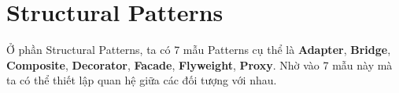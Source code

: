 \section{Structural Patterns}
Ở phần Structural Patterns, ta có 7 mẫu Patterns cụ thể là \textbf{Adapter}, \textbf{Bridge}, \textbf{Composite}, \textbf{Decorator}, \textbf{Facade}, \textbf{Flyweight}, \textbf{Proxy}. Nhờ vào 7 mẫu này mà ta có thể thiết lập quan hệ giữa các đối tượng với nhau.\\






